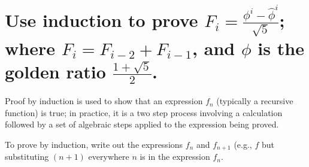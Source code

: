 \section[Problem 2]{Use induction to prove $F_i = \frac{\phi^i - \hat{\phi}^i}{\sqrt{5}}$; where $F_i = F_{i-2} + F_{i-1}$, and $\phi$ is the golden ratio $\frac{1 + \sqrt{5}}{2}$.}

Proof by induction is used to show that an expression $f_n$ (typically a recursive function) is true; in practice, it is a two step process involving a calculation followed by a set of algebraic steps applied to the expression being proved. 

To prove by induction, write out the expressions $f_n$ and $f_{n + 1}$ (e.g., $f$ but substituting $(n + 1)$ everywhere $n$ is in the expression $f_n$.
